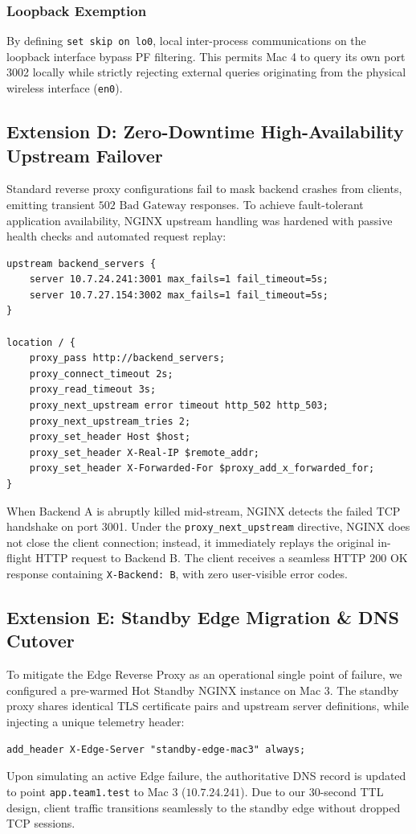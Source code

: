 \documentclass[conference]{IEEEtran}
\begin{document}
\subsubsection{Loopback Exemption}
By defining \texttt{set skip on lo0}, local inter-process communications on the loopback interface bypass PF filtering. This permits Mac 4 to query its own port 3002 locally while strictly rejecting external queries originating from the physical wireless interface (\texttt{en0}).

\subsection{Extension D: Zero-Downtime High-Availability Upstream Failover}
Standard reverse proxy configurations fail to mask backend crashes from clients, emitting transient $502\text{ Bad Gateway}$ responses. To achieve fault-tolerant application availability, NGINX upstream handling was hardened with passive health checks and automated request replay:
\begin{lstlisting}
upstream backend_servers {
    server 10.7.24.241:3001 max_fails=1 fail_timeout=5s;
    server 10.7.27.154:3002 max_fails=1 fail_timeout=5s;
}

location / {
    proxy_pass http://backend_servers;
    proxy_connect_timeout 2s;
    proxy_read_timeout 3s;
    proxy_next_upstream error timeout http_502 http_503;
    proxy_next_upstream_tries 2;
    proxy_set_header Host $host;
    proxy_set_header X-Real-IP $remote_addr;
    proxy_set_header X-Forwarded-For $proxy_add_x_forwarded_for;
}
\end{lstlisting}

When Backend A is abruptly killed mid-stream, NGINX detects the failed TCP handshake on port 3001. Under the \texttt{proxy\_next\_upstream} directive, NGINX does not close the client connection; instead, it immediately replays the original in-flight HTTP request to Backend B. The client receives a seamless $\text{HTTP } 200\text{ OK}$ response containing \texttt{X-Backend: B}, with zero user-visible error codes.

\subsection{Extension E: Standby Edge Migration \& DNS Cutover}
To mitigate the Edge Reverse Proxy as an operational single point of failure, we configured a pre-warmed Hot Standby NGINX instance on Mac 3. The standby proxy shares identical TLS certificate pairs and upstream server definitions, while injecting a unique telemetry header:
\begin{lstlisting}
add_header X-Edge-Server "standby-edge-mac3" always;
\end{lstlisting}
Upon simulating an active Edge failure, the authoritative DNS record is updated to point \texttt{app.team1.test} to Mac 3 ($10.7.24.241$). Due to our 30-second TTL design, client traffic transitions seamlessly to the standby edge without dropped TCP sessions.
\end{document}
